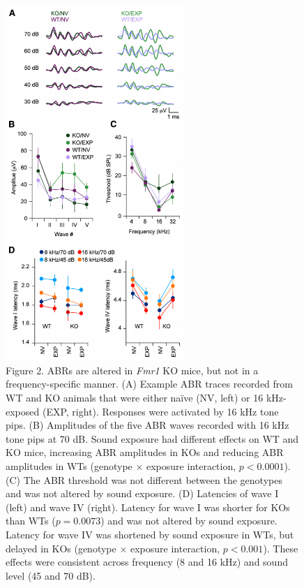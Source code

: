 \begin{figure}
  \centering
  	\includegraphics[width=0.6\textwidth]{images/C2F2}
  \captionsetup{labelformat=empty}
  \caption{\footnotesize{Figure 2. ABRs are altered in \textit{Fmr1} KO mice, but not in a frequency-specific manner. (A) Example ABR traces recorded from WT and KO animals that were either na\"ive (NV, left) or 16 kHz-exposed (EXP, right). Responses were activated by 16 kHz tone pips. (B) Amplitudes of the five ABR waves recorded with 16 kHz tone pips at 70 dB. Sound exposure had different effects on WT and KO mice, increasing ABR amplitudes in KOs and reducing ABR amplitudes in WTs (genotype $\times$ exposure interaction, $p<0.0001$). (C) The ABR threshold was not different between the genotypes and was not altered by sound exposure. (D) Latencies of wave I (left) and wave IV (right). Latency for wave I was shorter for KOs than WTs ($p=0.0073$) and was not altered by sound exposure. Latency for wave IV was shortened by sound exposure in WTs, but delayed in KOs (genotype $\times$ exposure interaction, $p<0.001$). These effects were consistent across frequency (8 and 16 kHz) and sound level (45 and 70 dB).}}
\end{figure}

